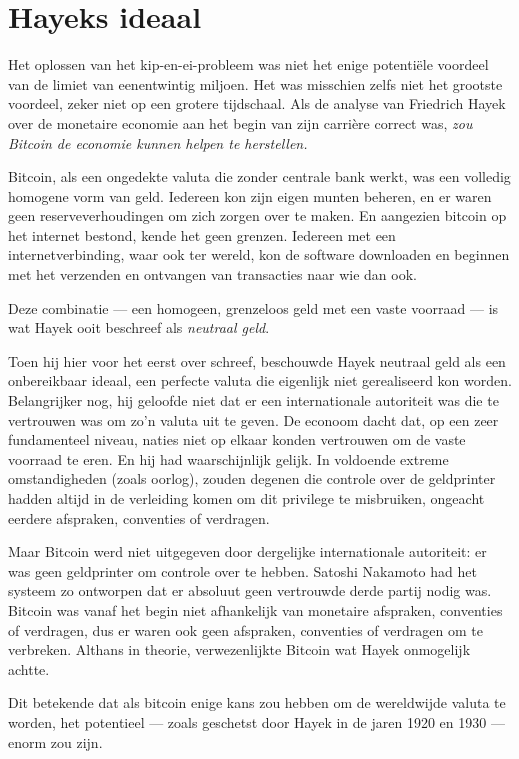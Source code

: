 \documentclass[
  a5paper,
  smalldemyvopaper,11pt,twoside,onecolumn,openright,extrafontsizes,
hidelinks]{memoir}
\begin{document}
\section{Hayeks ideaal}\label{hayeks-ideaal}

Het oplossen van het kip-en-ei-probleem was niet het enige potentiële
voordeel van de limiet van eenentwintig miljoen. Het was misschien zelfs
niet het grootste voordeel, zeker niet op een grotere tijdschaal. Als de
analyse van Friedrich Hayek over de monetaire economie aan het begin van
zijn carrière correct was, \emph{zou Bitcoin de economie kunnen helpen
te herstellen.}

Bitcoin, als een ongedekte valuta die zonder centrale bank werkt, was
een volledig homogene vorm van geld. Iedereen kon zijn eigen munten
beheren, en er waren geen reserveverhoudingen om zich zorgen over te
maken. En aangezien bitcoin op het internet bestond, kende het geen
grenzen. Iedereen met een internetverbinding, waar ook ter wereld, kon
de software downloaden en beginnen met het verzenden en ontvangen van
transacties naar wie dan ook.

Deze combinatie --- een homogeen, grenzeloos geld met een vaste voorraad
--- is wat Hayek ooit beschreef als \emph{neutraal geld}.

Toen hij hier voor het eerst over schreef, beschouwde Hayek neutraal
geld als een onbereikbaar ideaal, een perfecte valuta die eigenlijk niet
gerealiseerd kon worden. Belangrijker nog, hij geloofde niet dat er een
internationale autoriteit was die te vertrouwen was om zo'n valuta uit
te geven. De econoom dacht dat, op een zeer fundamenteel niveau, naties
niet op elkaar konden vertrouwen om de vaste voorraad te eren. En hij
had waarschijnlijk gelijk. In voldoende extreme omstandigheden (zoals
oorlog), zouden degenen die controle over de geldprinter hadden altijd
in de verleiding komen om dit privilege te misbruiken, ongeacht eerdere
afspraken, conventies of verdragen.

Maar Bitcoin werd niet uitgegeven door dergelijke internationale
autoriteit: er was geen geldprinter om controle over te hebben. Satoshi
Nakamoto had het systeem zo ontworpen dat er absoluut geen vertrouwde
derde partij nodig was. Bitcoin was vanaf het begin niet afhankelijk van
monetaire afspraken, conventies of verdragen, dus er waren ook geen
afspraken, conventies of verdragen om te verbreken. Althans in theorie,
verwezenlijkte Bitcoin wat Hayek onmogelijk achtte.

Dit betekende dat als bitcoin enige kans zou hebben om de wereldwijde
valuta te worden, het potentieel --- zoals geschetst door Hayek in de
jaren 1920 en 1930 --- enorm zou zijn.
\end{document}
